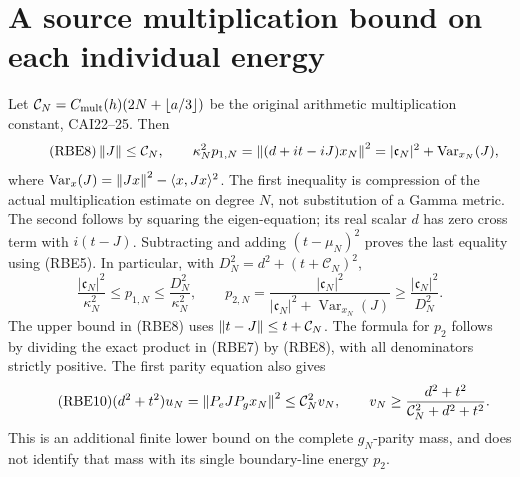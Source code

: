 \section{A source multiplication bound on each individual energy}

Let \(\mathcal C_N=C_{\rm mult}(h)(2N+\lfloor a/3\rfloor)\)
be the original arithmetic multiplication constant, CAI22--25.
Then
\begin{equation}\tag{RBE8}
 \left\lVert J\right\rVert\le\mathcal C_N,\qquad
 \kappa_N^2p_{1,N}
   =\left\lVert(d+it-iJ)x_N\right\rVert^2
   =|\mathfrak c_N|^2+\operatorname{Var}_{x_N}(J),
\end{equation}
where \(\operatorname{Var}_{x}(J)=\left\lVert Jx\right\rVert^2-\langle x,Jx\rangle^2\).
The first inequality is compression of the actual multiplication
estimate on degree \(N\), not substitution of a Gamma metric.
The second follows by squaring the eigen-equation; its real scalar
\(d\) has zero cross term with \(i(t-J)\). Subtracting and adding
\((t-\mu_N)^2\) proves the last equality using (RBE5).
In particular, with
\(D_N^2=d^2+(t+\mathcal C_N)^2\),
\begin{equation}\tag{RBE9}
 \frac{|\mathfrak c_N|^2}{\kappa_N^2}
 \le p_{1,N}\le\frac{D_N^2}{\kappa_N^2},\qquad
 p_{2,N}=\frac{|\mathfrak c_N|^2}
 {|\mathfrak c_N|^2+\operatorname{Var}_{x_N}(J)}
 \ge\frac{|\mathfrak c_N|^2}{D_N^2}.
\end{equation}
The upper bound in (RBE8) uses \(\left\lVert t-J\right\rVert\le t+\mathcal C_N\).
The formula for \(p_2\) follows by dividing the exact product
in (RBE7) by (RBE8), with all denominators strictly positive.
The first parity equation also gives
\begin{equation}\tag{RBE10}
 (d^2+t^2)u_N=\left\lVert P_eJP_gx_N\right\rVert^2
   \le\mathcal C_N^2v_N,\qquad
 v_N\ge\frac{d^2+t^2}{\mathcal C_N^2+d^2+t^2}.
\end{equation}
This is an additional finite lower bound on the complete
\(g_N\)-parity mass, and does not identify that mass with its
single boundary-line energy \(p_2\).

